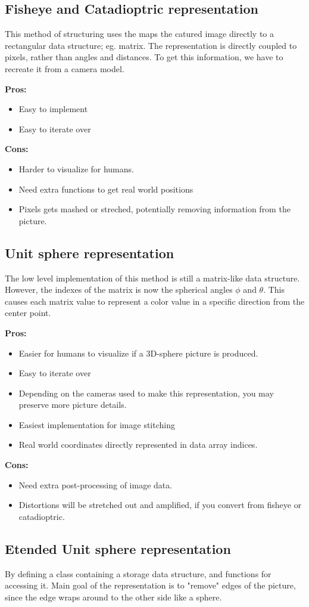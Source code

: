 \subsection{Fisheye and Catadioptric representation}
This method of structuring uses the maps the catured image directly to a rectangular data structure; eg. matrix. The representation is directly coupled to pixels, rather than angles and distances. To get this information, we have to recreate it from a camera model.

\textbf{Pros:}
\begin{itemize}
    \item Easy to implement
    \item Easy to iterate over
\end{itemize}

\textbf{Cons:}
\begin{itemize}
    \item Harder to visualize for humans. 
    \item Need extra functions to get real world positions
    \item Pixels gets mashed or streched, potentially removing information from the picture.
\end{itemize}

\subsection{Unit sphere representation}
The low level implementation of this method is still a matrix-like data structure. However, the indexes of the matrix is now the spherical angles $\phi$ and $\theta$. This causes each matrix value to represent a color value in a specific direction from the center point.

\textbf{Pros:}
\begin{itemize}
    \item Easier for humans to visualize if a 3D-sphere picture is produced.
    \item Easy to iterate over
    \item Depending on the cameras used to make this representation, you may preserve more picture details.
    \item Easiest implementation for image stitching
    \item Real world coordinates directly represented in data array indices. 
\end{itemize}

\textbf{Cons:}
\begin{itemize}
    \item Need extra post-processing of image data. 
    \item Distortions will be stretched out and amplified, if you convert from fisheye or catadioptric.
\end{itemize}

\subsection{Etended Unit sphere representation}
By defining a class containing a storage data structure, and functions for accessing it. Main goal of the representation is to "remove" edges of the picture, since the edge wraps around to the other side like a sphere.

